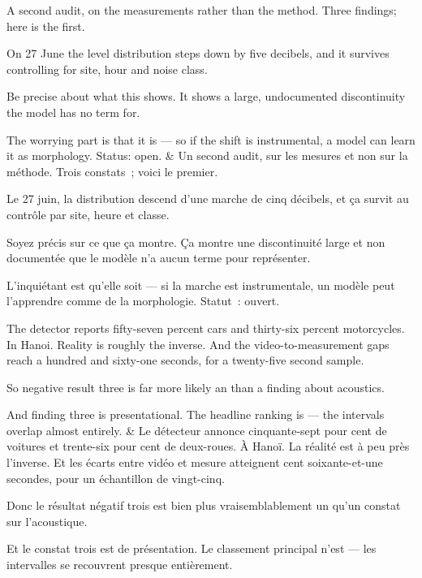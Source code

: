 \documentclass[10pt,a4paper]{article}
\begin{document}
\begin{say}
A second audit, on the measurements rather than the method. Three findings; here
is the first.

On 27 June the level distribution steps down by five decibels, and it survives
controlling for site, hour and noise class.

Be precise about what this shows.  It shows a large, undocumented discontinuity the model has no term for.

The worrying part is that it is  --- so if the shift is
instrumental, a model can learn it as morphology. Status: open.
&
Un second audit, sur les mesures et non sur la méthode. Trois constats~; voici le
premier.

Le 27 juin, la distribution descend d'une marche de cinq décibels, et ça survit au
contrôle par site, heure et classe.

Soyez précis sur ce que ça montre. 
Ça montre une discontinuité large et non documentée que le modèle n'a aucun terme
pour représenter.

L'inquiétant est qu'elle soit  --- si la marche est
instrumentale, un modèle peut l'apprendre comme de la morphologie. Statut~:
ouvert.
\end{say}

\begin{say}
The detector reports fifty-seven percent cars and thirty-six percent motorcycles.
In Hanoi. Reality is roughly the inverse. And the video-to-measurement gaps reach
a hundred and sixty-one seconds, for a twenty-five second sample.

So negative result three is far more likely an  than a
finding about acoustics.

And finding three is presentational. The headline ranking is  --- the intervals overlap almost entirely.
&
Le détecteur annonce cinquante-sept pour cent de voitures et trente-six pour cent
de deux-roues. À Hanoï. La réalité est à peu près l'inverse. Et les écarts entre
vidéo et mesure atteignent cent soixante-et-une secondes, pour un échantillon de
vingt-cinq.

Donc le résultat négatif trois est bien plus vraisemblablement un  qu'un constat sur l'acoustique.

Et le constat trois est de présentation. Le classement principal n'est  --- les intervalles se recouvrent presque entièrement.
\end{say}
\end{document}
